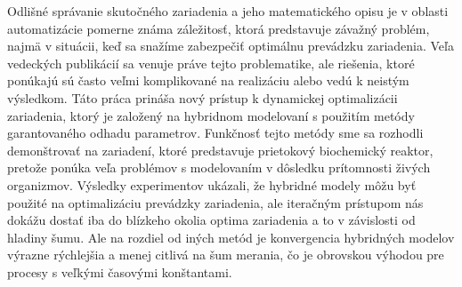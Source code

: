 Odlišné správanie skutočného zariadenia a jeho matematického opisu je v oblasti automatizácie pomerne známa záležitosť, ktorá predstavuje závažný problém, najmä v situácii, keď sa snažíme zabezpečiť optimálnu prevádzku zariadenia. Veľa vedeckých publikácií sa venuje práve tejto problematike, ale riešenia, ktoré ponúkajú sú často veľmi komplikované na realizáciu alebo vedú k neistým výsledkom. Táto práca prináša nový prístup k dynamickej optimalizácii zariadenia, ktorý je založený na hybridnom modelovaní s použitím metódy garantovaného odhadu parametrov. Funkčnosť tejto metódy sme sa rozhodli demonštrovať na zariadení, ktoré predstavuje prietokový biochemický reaktor, pretože ponúka veľa problémov s modelovaním v dôsledku prítomnosti živých organizmov. Výsledky experimentov ukázali, že hybridné modely môžu byť použité na optimalizáciu prevádzky zariadenia, ale iteračným prístupom nás dokážu dostať iba do blízkeho okolia optima zariadenia a to v závislosti od hladiny šumu. Ale na rozdiel od iných metód je konvergencia hybridných modelov výrazne rýchlejšia a menej citlivá na šum merania, čo je obrovskou výhodou pre procesy s veľkými časovými konštantami.

